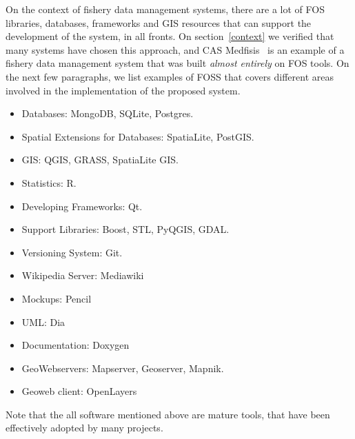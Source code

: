 \documentclass[11pt]{article} %
\begin{document}
On the context of fishery data management systems, there are a lot of FOS libraries, databases, frameworks and GIS resources that can support the development of the system, in all fronts. On section~\ref{context} we verified that many systems have chosen this approach, and CAS Medfisis~\cite{medfisis} is an example of a fishery data management system that was built \emph{almost entirely} on FOS tools. On the next few paragraphs, we list examples of FOSS that covers different areas involved in the implementation of the proposed system. 
\begin{itemize}
\item Databases: MongoDB, SQLite, Postgres.
\item Spatial Extensions for Databases: SpatiaLite, PostGIS.
\item GIS: QGIS, GRASS, SpatiaLite GIS.
\item Statistics: R.
\item Developing Frameworks: Qt.
\item Support Libraries: Boost, STL, PyQGIS, GDAL.
\item Versioning System: Git.
\item Wikipedia Server: Mediawiki
\item Mockups: Pencil
\item UML: Dia
\item Documentation: Doxygen
\item GeoWebservers: Mapserver, Geoserver, Mapnik.
\item Geoweb client: OpenLayers
\end{itemize}
Note that the all software mentioned above are mature tools, that have been effectively adopted by many projects.





\end{document}
